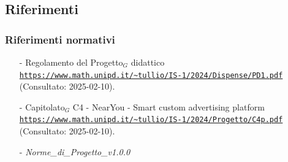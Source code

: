 \documentclass[10pt]{article}
\begin{document}
\subsection{Riferimenti}
\subsubsection{Riferimenti normativi}
\begin{itemize}
    \item[-] Regolamento del Progetto$_G$ didattico  \\
    \textcolor{blue}{\texttt{\url{https://www.math.unipd.it/~tullio/IS-1/2024/Dispense/PD1.pdf}}}\\ (Consultato: 2025-02-10).
    \item[-] Capitolato$_G$ C4 - NearYou - Smart custom advertising platform\\
    \textcolor{blue}{\texttt{\url{https://www.math.unipd.it/~tullio/IS-1/2024/Progetto/C4p.pdf}}}\\ (Consultato: 2025-02-10).
    \item[-] \textit{Norme\_di\_Progetto\_v1.0.0}
\end{itemize}
\end{document}
